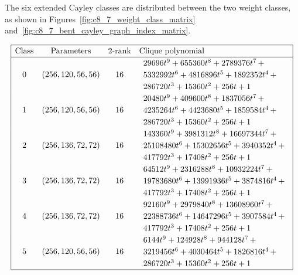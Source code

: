 \documentclass[12pt,a4paper]{article}
\begin{document}
The six extended Cayley classes are distributed between the two weight classes,
as shown in Figures~\ref{fig:c8_7_weight_class_matrix} and~\ref{fig:c8_7_bent_cayley_graph_index_matrix}.

\begin{table}[!bhpt] %
\small{}
\begin{align*}
\def\arraystretch{1.2}
\begin{array}{|cccl|}
\hline
\text{Class} &
\text{Parameters} &
\text{2-rank} &
\text{Clique polynomial}
\\
\hline
0 &
(256, 120, 56, 56) &
16 &
\begin{array}{l}
29696t^{9} + 655360t^{8} + 2789376t^{7}
\,+
\\
 5332992t^{6} + 4816896t^{5} + 1892352t^{4}
\,+
\\
 286720t^{3} + 15360t^{2} + 256t + 1
\end{array}
\\
1 &
(256, 120, 56, 56) &
16 &
\begin{array}{l}
20480t^{9} + 409600t^{8} + 1837056t^{7}
\,+
\\
 4235264t^{6} + 4423680t^{5} + 1859584t^{4}
\,+
\\
 286720t^{3} + 15360t^{2} + 256t + 1
\end{array}
\\
2 &
(256, 136, 72, 72) &
16 &
\begin{array}{l}
143360t^{9} + 3981312t^{8} + 16697344t^{7}
\,+
\\
 25108480t^{6} + 15302656t^{5} + 3940352t^{4}
\,+
\\
 417792t^{3} + 17408t^{2} + 256t + 1
\end{array}
\\
3 &
(256, 136, 72, 72) &
16 &
\begin{array}{l}
64512t^{9} + 2316288t^{8} + 10932224t^{7}
\,+
\\
 19783680t^{6} + 13991936t^{5} + 3874816t^{4}
\,+
\\
 417792t^{3} + 17408t^{2} + 256t + 1
\end{array}
\\
4 &
(256, 136, 72, 72) &
16 &
\begin{array}{l}
92160t^{9} + 2979840t^{8} + 13608960t^{7}
\,+
\\
 22388736t^{6} + 14647296t^{5} + 3907584t^{4}
\,+
\\
 417792t^{3} + 17408t^{2} + 256t + 1
\end{array}
\\
5 &
(256, 120, 56, 56) &
16 &
\begin{array}{l}
6144t^{9} + 124928t^{8} + 944128t^{7}
\,+
\\
 3219456t^{6} + 4030464t^{5} + 1826816t^{4}
\,+
\\
 286720t^{3} + 15360t^{2} + 256t + 1
\end{array}
\\
\hline
\end{array}
\end{align*}

\caption{$[f_{8,7}]$ extended Cayley classes.}
\label{tab-c8_7_EC_classes}
\end{table}
\end{document}
